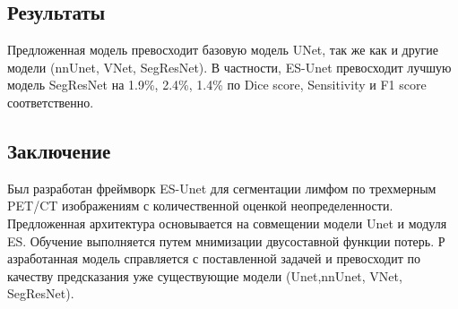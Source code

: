 \subsection*{Результаты}
Предложенная модель превосходит базовую модель UNet, так же как и другие модели (nnUnet, VNet, SegResNet). 
В частности, ES-Unet превосходит лучшую модель SegResNet на 1.9\%, 2.4\%, 1.4\% по Dice score, Sensitivity и F1 score соответственно.
\subsection*{Заключение}
Был разработан фреймворк ES-Unet для сегментации лимфом по трехмерным PET/CT изображениям с 
количественной оценкой неопределенности. Предложенная архитектура основывается на совмещении 
модели Unet и модуля ES. Обучение выполняется путем мнимизации двусоставной функции потерь. Р
азработанная модель справляется с поставленной задачей и превосходит по качеству предсказания 
уже существующие модели (Unet,nnUnet, VNet, SegResNet).